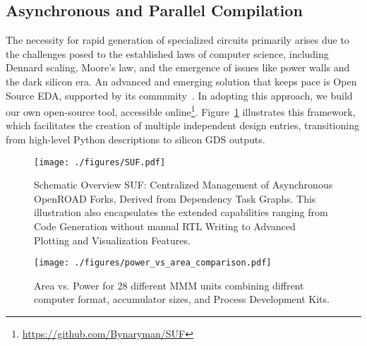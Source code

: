 \subsection{Asynchronous and Parallel Compilation}
\label{sec:framework}

The necessity for rapid generation of specialized circuits primarily arises due to the challenges posed to the established laws of computer science, including Dennard scaling, Moore's law, and the emergence of issues like power walls and the dark silicon era.
An advanced and emerging solution that keeps pace is Open Source EDA, supported by its community~\cite{ajayi2019toward}.
In adopting this approach, we build our own open-source tool, accessible online\footnote{\url{https://github.com/Bynaryman/SUF}}.
Figure~\ref{fig:suf} illustrates this framework, which facilitates the creation of multiple independent design entries, transitioning from high-level Python descriptions to silicon GDS outputs.

\begin{figure}[t]
\centering
	\texttt{[image: ./figures/SUF.pdf]}
	\vspace{-0.3cm}
	\caption{Schematic Overview SUF: Centralized Management of Asynchronous OpenROAD Forks, Derived from Dependency Task Graphs. This illustration also encapsulates the extended capabilities ranging from Code Generation without manual RTL Writing to Advanced Plotting and Visualization Features.}
	\vspace{-0.3cm}
	\label{fig:suf}
\end{figure}

\begin{figure}[b]
\centering
	\vspace{-0.5cm}
	\texttt{[image: ./figures/power\_vs\_area\_comparison.pdf]}
	\vspace{-0.2cm}
	\caption{Area vs. Power for 28 different MMM units combining diffrent computer format, accumulator sizes, and Process Development Kits.}
	\label{fig:power_vs_area}
\end{figure}

